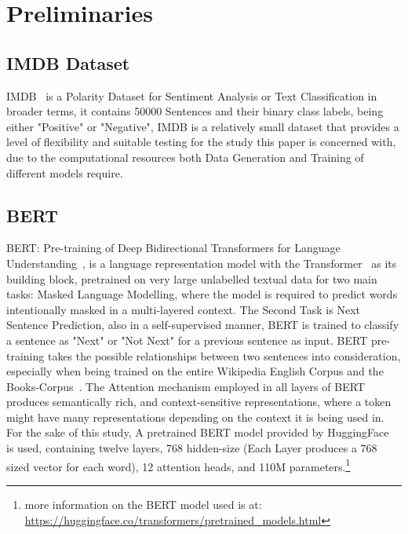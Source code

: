 \documentclass[conference]{IEEEtran}
\begin{document}
\section{Preliminaries}
\subsection{IMDB Dataset}
IMDB~\cite{imdb} is a Polarity Dataset for Sentiment Analysis or Text Classification in broader terms, it contains 50000 Sentences and their binary class labels, being either "Positive" or "Negative", IMDB is a relatively small dataset that provides a level of flexibility and suitable testing for the study this paper is concerned with, due to the computational resources both Data Generation and Training of different models require. 
		
\subsection{BERT}
			
			BERT: Pre-training of Deep Bidirectional Transformers for Language 
					Understanding~\cite{Bert}, is a language representation model with
					the Transformer~\cite{attention} as its building block,
					pretrained on very large unlabelled textual data for two main 
					tasks: Masked Language Modelling, where the model is required to 
					predict words intentionally masked in a multi-layered context. The Second Task is Next Sentence
					Prediction, also in a self-supervised manner, BERT is trained 
					to classify a sentence as "Next" or "Not Next" for a previous 
					sentence as input. BERT pre-training takes the possible relationships between two sentences into consideration, especially when being trained on the entire Wikipedia English Corpus and the Books-Corpus~\cite{bookcorpus}. The Attention mechanism employed in all layers of BERT produces semantically rich, and 
					context-sensitive representations, where a token might have many 
					representations depending on the context it is being used in.
					For the sake of this study, A pretrained BERT model provided by
					HuggingFace~\cite{huggingface} is used, containing twelve
					layers, 768 hidden-size (Each Layer produces a 768 sized vector for 
					each word), 12 attention heads, and 110M parameters.\footnote{more information on the BERT model used is at: 	\url{https://huggingface.co/transformers/pretrained_models.html}}
\end{document}
